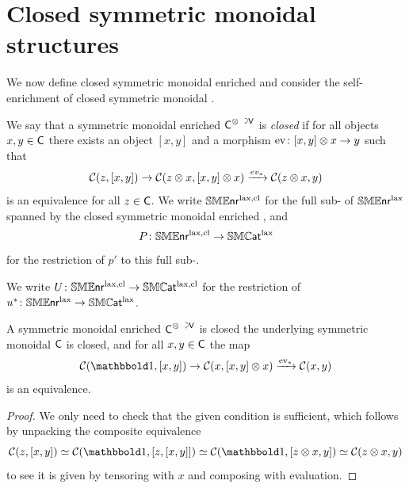 \documentclass[a4paper,11pt]{article}
\begin{document}
\section{Closed symmetric monoidal structures}\label{sec:closed}

We now define closed symmetric monoidal enriched \icats{} and consider
the self-enrichment of closed symmetric monoidal \icats{}.

\begin{defn}
  We say that a symmetric monoidal enriched \icat{} $\utract{C}{V}$ is
  \emph{closed} if for all objects $x,y \in \textup{\textsf{C}}$ there exists an
  object $[x,y]$ and a morphism $\ev \colon [x,y] \otimes x \to y$ such that
  \[ \eC(z, [x,y]) \to \eC(z \otimes x, [x,y] \otimes x) \xto{ev_{*}} \eC(z
    \otimes x, y)\]
  is an equivalence for all $z \in \textup{\textsf{C}}$. We write $\mathbb{SME}\mkern-0.5mu\textsf{\textup{nr}}^{\text{\textup{lax}},\text{\textup{cl}}}$ for the
  full sub-\itcat{} of $\mathbb{SME}\mkern-0.5mu\textsf{\textup{nr}}^{\text{\textup{lax}}}$ spanned by the closed symmetric
  monoidal enriched \icats{}, and
  \[ P \colon \SMENRlcl \to \SMCATl\]
  for the restriction of $p'$ to this full sub-\itcat{}.
\end{defn}

\begin{notation}
  We write $U \colon \SMENRlcl \to \SMCATlcl$ for the restriction of
  $u^{*} \colon \SMENRl \to \SMCATl$.
\end{notation}

\begin{lemma}
  A symmetric monoidal enriched \icat{} $\utract{C}{V}$ is closed
  \IFF{} the underlying symmetric monoidal \icat{} $\textup{\textsf{C}}$ is closed,
  and for all $x,y \in \textup{\textsf{C}}$ the map
  \[ \eC(\bbone, [x,y]) \to \eC(x, [x,y] \otimes x) \xto{\ev_{*}} \eC(x, y)\]
  is an equivalence.
\end{lemma}
\begin{proof}
  We only need to check that the given condition is sufficient, which
  follows by unpacking the composite equivalence
  \[ \eC(z, [x,y]) \simeq \eC(\bbone, [z, [x,y]]) \simeq \eC(\bbone, [z
    \otimes x, y]) \simeq \eC(z \otimes x, y)\] to see it is given by
  tensoring with $x$ and composing with evaluation.
\end{proof}
\end{document}
